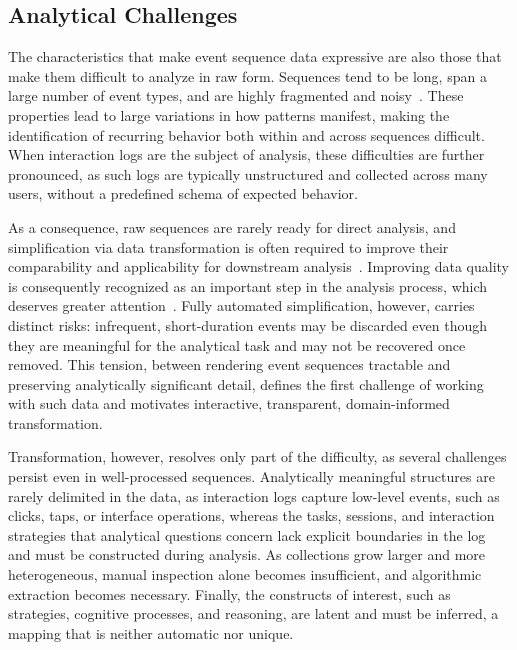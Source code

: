\subsection{Analytical Challenges}

The characteristics that make event sequence data expressive are also those that make them difficult to analyze in raw form.
Sequences tend to be long, span a large number of event types, and are highly fragmented and noisy~\cite{guo2022survey}.
These properties lead to large variations in how patterns manifest, making the identification of recurring behavior both within and across sequences difficult.
When interaction logs are the subject of analysis, these difficulties are further pronounced, as such logs are typically unstructured and collected across many users, without a predefined schema of expected behavior.

As a consequence, raw sequences are rarely ready for direct analysis, and simplification via data transformation is often required to improve their comparability and applicability for downstream analysis~\cite{du2017coping}.
Improving data quality is consequently recognized as an important step in the analysis process, which deserves greater attention~\cite{endel2015data, furche2016data}. 
Fully automated simplification, however, carries distinct risks: infrequent, short-duration events may be discarded even though they are meaningful for the analytical task and may not be recovered once removed.
This tension, between rendering event sequences tractable and preserving analytically significant detail, defines the first challenge of working with such data and motivates interactive, transparent, domain-informed transformation.

Transformation, however, resolves only part of the difficulty, as several challenges persist even in well-processed sequences.
Analytically meaningful structures are rarely delimited in the data, as interaction logs capture low-level events, such as clicks, taps, or interface operations, whereas the tasks, sessions, and interaction strategies that analytical questions concern lack explicit boundaries in the log and must be constructed during analysis.
As collections grow larger and more heterogeneous, manual inspection alone becomes insufficient, and algorithmic extraction becomes necessary.
Finally, the constructs of interest, such as strategies, cognitive processes, and reasoning, are latent and must be inferred, a mapping that is neither automatic nor unique.

